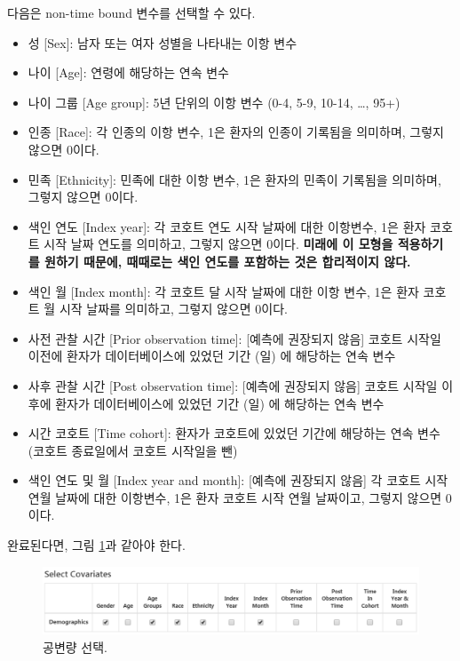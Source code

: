 \documentclass[11pt]{book}
\providecommand{\tightlist}{%
  \setlength{\itemsep}{0pt}\setlength{\parskip}{0pt}}
\theoremstyle{definition}
\theoremstyle{definition}
\theoremstyle{definition}
\theoremstyle{remark}
\begin{document}
다음은 non-time bound 변수를 선택할 수 있다.

\begin{itemize}
\tightlist
\item
  성 {[}Sex{]}: 남자 또는 여자 성별을 나타내는 이항 변수
\item
  나이 {[}Age{]}: 연령에 해당하는 연속 변수
\item
  나이 그룹 {[}Age group{]}: 5년 단위의 이항 변수 (0-4, 5-9, 10-14,
  \ldots{}, 95+)
\item
  인종 {[}Race{]}: 각 인종의 이항 변수, 1은 환자의 인종이 기록됨을
  의미하며, 그렇지 않으면 0이다.
\item
  민족 {[}Ethnicity{]}: 민족에 대한 이항 변수, 1은 환자의 민족이
  기록됨을 의미하며, 그렇지 않으면 0이다.
\item
  색인 연도 {[}Index year{]}: 각 코호트 연도 시작 날짜에 대한 이항변수,
  1은 환자 코호트 시작 날짜 연도를 의미하고, 그렇지 않으면 0이다.
  \textbf{미래에 이 모형을 적용하기를 원하기 때문에, 때때로는 색인
  연도를 포함하는 것은 합리적이지 않다.}
\item
  색인 월 {[}Index month{]}: 각 코호트 달 시작 날짜에 대한 이항 변수,
  1은 환자 코호트 월 시작 날짜를 의미하고, 그렇지 않으면 0이다.
\item
  사전 관찰 시간 {[}Prior observation time{]}: {[}예측에 권장되지
  않음{]} 코호트 시작일 이전에 환자가 데이터베이스에 있었던 기간 (일) 에
  해당하는 연속 변수
\item
  사후 관찰 시간 {[}Post observation time{]}: {[}예측에 권장되지 않음{]}
  코호트 시작일 이후에 환자가 데이터베이스에 있었던 기간 (일) 에
  해당하는 연속 변수
\item
  시간 코호트 {[}Time cohort{]}: 환자가 코호트에 있었던 기간에 해당하는
  연속 변수 (코호트 종료일에서 코호트 시작일을 뺀)
\item
  색인 연도 및 월 {[}Index year and month{]}: {[}예측에 권장되지 않음{]}
  각 코호트 시작 연월 날짜에 대한 이항변수, 1은 환자 코호트 시작 연월
  날짜이고, 그렇지 않으면 0이다.
\end{itemize}

완료된다면, 그림 \ref{fig:covariateSettings2}과 같아야 한다.

\begin{figure}

{\centering \includegraphics[width=1\linewidth]{images/PatientLevelPrediction/covariateSettings2} 

}

\caption{공변량 선택.}\label{fig:covariateSettings2}
\end{figure}
\end{document}
